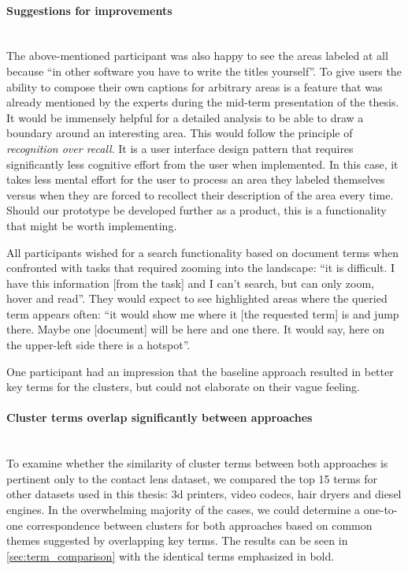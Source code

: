 \paragraph{Suggestions for improvements}~\\
The above-mentioned participant was also happy to see the areas labeled at all because ``in other software you have to write the titles yourself''.
To give users the ability to compose their own captions for arbitrary areas is a feature that was already mentioned by the experts during the mid-term presentation of the thesis.
It would be immensely helpful for a detailed analysis to be able to draw a boundary around an interesting area.
This would follow the principle of \textit{recognition over recall}.
It is a user interface design pattern that requires significantly less cognitive effort from the user when implemented.
In this case, it takes less mental effort for the user to process an area they labeled themselves versus when they are forced to recollect their description of the area every time.
Should our prototype be developed further as a product, this is a functionality that might be worth implementing.

All participants wished for a search functionality based on document terms when confronted with tasks that required zooming into the landscape: ``it is difficult. I have this information [from the task] and I can't search, but can only zoom, hover and read''.
They would expect to see highlighted areas where the queried term appears often: ``it would show me where it [the requested term] is and jump there. Maybe one [document] will be here and one there. It would say, here on the upper-left side there is a hotspot''.

One participant had an impression that the baseline approach resulted in better key terms for the clusters, but could not elaborate on their vague feeling.

\paragraph{Cluster terms overlap significantly between approaches}~\\
To examine whether the similarity of cluster terms between both approaches is pertinent only to the contact lens dataset, we compared the top 15 terms for other datasets used in this thesis: 3d printers, video codecs, hair dryers and diesel engines. 
In the overwhelming majority of the cases, we could determine a one-to-one correspondence between clusters for both approaches based on common themes suggested by overlapping key terms. 
The results can be seen in \autoref{sec:term_comparison} with the identical terms emphasized in bold.

